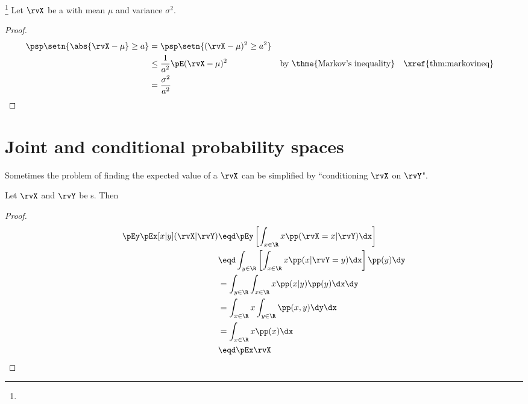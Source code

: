\begin{theorem}
\footnote{
  }
Let $\rvX$ be a  with mean $\mu$ and variance $\sigma^2$.
\end{theorem}
\begin{proof}
\begin{align*}
  \psp\setn{\abs{\rvX-\mu} \ge a}
    &=   \psp\setn{ (\rvX-\mu)^2 \ge a^2}
  \\&\le \frac{1}{a^2} \pE(\rvX-\mu)^2 
    && \text{by \thme{Markov's inequality}}
    && \text{\xref{thm:markovineq}}
  \\&=   \frac{\sigma^2}{a^2}
\end{align*}
\end{proof}

\section{Joint and conditional probability spaces}
Sometimes the problem of finding the expected value of a  $\rvX$
can be simplified by ``conditioning $\rvX$ on $\rvY$".
\begin{theorem}
Let $\rvX$ and $\rvY$ be s. Then
\thmbox{\pEx{\rvX} = \pEy\pEx[x|y](\rvX|\rvY) }
\end{theorem}
\begin{proof}
\begin{align*}
   \pEy\pEx[x|y](\rvX|\rvY)
     &\eqd \pEy \left[ \int_{x\in\R}x \pp(\rvX=x|\rvY) \dx \right]
   \\&\eqd \int_{y\in\R} \left[\int_{x\in\R}x \pp(x|\rvY=y) \dx \right] \pp(y) \dy
   \\&=    \int_{y\in\R} \int_{x\in\R}x \pp(x|y)\pp(y) \dx   \dy
   \\&=    \int_{x\in\R}x \int_{y\in\R} \pp(x,y) \dy   \dx
   \\&=    \int_{x\in\R}x \pp(x) \dx
   \\&\eqd \pEx\rvX
\end{align*}
\end{proof}

